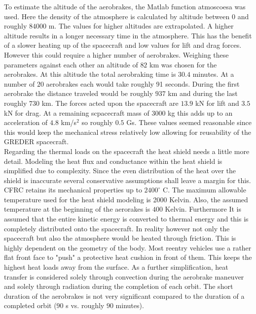 To estimate the altitude of the aerobrakes, the Matlab function atmoscoesa was used. Here the density of the atmosphere is calculated by altitude between $0$ and roughly $84000$ m. The values for higher altitudes are extrapolated. A higher altitude results in a longer necessary time in the atmosphere. This has the benefit of a slower heating up of the spacecraft and low values for lift and drag forces. However this could require a higher number of aerobrakes. Weighing these parameters against each other an altitude of $82$ km was chosen for the aerobrakes. At this altitude the total aerobraking time is $30.4$ minutes. At a number of $20$ aerobrakes each would take roughly 91 seconds. During the first aerobrake the distance traveled would be roughly $937$ km and during the last roughly $730$ km. The forces acted upon the spacecraft are $13.9$ kN for lift and $3.5$ kN for drag. At a remaining scpacecraft mass of $3000$ kg this adds up to an acceleration of $4.8$ km/s$^2$ so roughly $0.5$ Gs. These values seemed reasonable since this would keep the mechanical stress relatively low allowing for reusability of the GREDER spacecraft.\\

Regarding the thermal loads on the spacecraft the heat shield needs a little more detail. Modeling the heat flux and conductance within the heat shield is simplified due to complexity. Since the even distribution of the heat over the shield is inaccurate several conservative assumptions shall leave a margin for this. CFRC retains its mechanical properties up to $2400^\circ$ C. The maximum allowable temperature used for the heat shield modeling is 2000 Kelvin. Also, the assumed temperature at the beginning of the aerorakes is $400$ Kelvin. Furthermore It is assumed that the entire kinetic energy is converted to thermal energy and this is completely distributed onto the spacecraft. In reality however not only the spacecraft but also the atmosphere would be heated through friction. This is highly dependent on the geometry of the body. Most reentry vehicles use a rather flat front face to "push" a protective heat cushion in front of them. This keeps the highest heat loads away from the surface. As a further simplification, heat transfer is considered solely through convection during the aerobrake maneuver and solely through radiation during the completion of each orbit. The short duration of the aerobrakes is not very significant compared to the duration of a completed orbit ($90$ s vs. roughly $90$ minutes).\\

